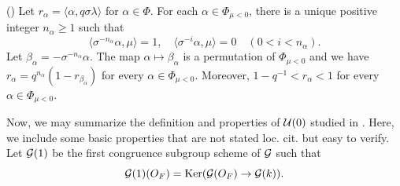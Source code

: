 \documentclass[12pt,reqno]{amsart}
\begin{document}
\begin{lem}\textup{(\cite[Lemma 3.12]{Tak25z})} \label{lem:vareps}
    Let $r_\alpha = \langle \alpha, q\sigma \lambda \rangle$ for $\alpha \in \Phi$. For each $\alpha \in \Phi_{\mu<0}$, there is a unique positive integer $n_\alpha \geq 1$ such that 
    \[
        \langle \sigma^{-n_\alpha}\alpha, \mu \rangle = 1, \quad 
        \langle \sigma^{- i}\alpha, \mu \rangle = 0 \quad (0 < i < n_\alpha). 
    \]
    Let $\beta_\alpha = - \sigma^{-n_\alpha}\alpha$. The map $\alpha \mapsto \beta_\alpha$ is a permutation of $\Phi_{\mu < 0}$ and we have $r_\alpha = q^{n_\alpha}(1-r_{\beta_\alpha})$ for every $\alpha \in \Phi_{\mu<0}$. Moreover, $1 - q^{-1} <r_\alpha<1$ for every $\alpha \in \Phi_{\mu<0}$. 
\end{lem}

Now, we may summarize the definition and properties of ${\mathcal{U}}(0)$ studied in \cite{Tak25z}. Here, we include some basic properties that are not stated loc. cit. but easy to verify. Let ${\mathcal{G}}(1)$ be the first congruence subgroup scheme of ${\mathcal{G}}$ such that
\[
    {\mathcal{G}}(1)(O_F) = {\operatorname{Ker}}({\mathcal{G}}(O_F) \to {\mathcal{G}}(k)). 
\]
\end{document}
